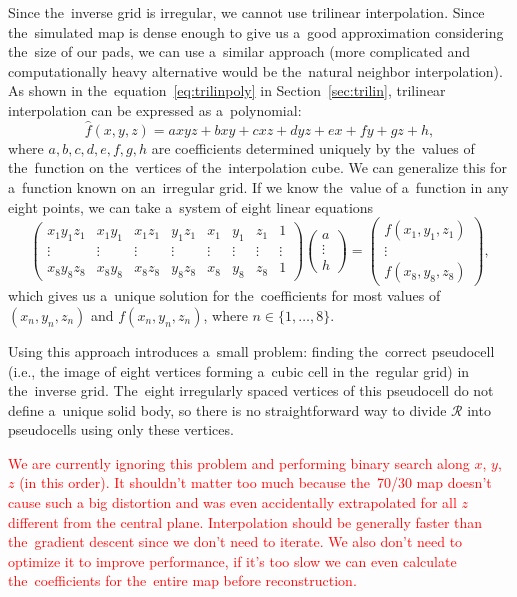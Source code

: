 			Since the~inverse grid is irregular, we cannot use trilinear interpolation. Since the~simulated map is dense enough to give us a~good approximation considering the~size of our pads, we can use a~similar approach (more complicated and computationally heavy alternative would be the~natural neighbor interpolation). As shown in the~equation~\ref{eq:trilinpoly} in Section~\ref{sec:trilin}, trilinear interpolation can be expressed as a~polynomial:
				\begin{equation}
					\widehat{f}(x,y,z) = axyz + bxy + cxz + dyz + ex + fy + gz + h,
				\end{equation}
			where $a,b,c,d,e,f,g,h$ are coefficients determined uniquely by the~values of the~function on the~vertices of the~interpolation cube. We can generalize this for a~function known on an~irregular grid. If we know the~value of a~function in any eight points, we can take a~system of eight linear equations
				\begin{equation}
					\begin{pmatrix}
						x_1 y_1 z_1 & x_1 y_1 & x_1 z_1 & y_1 z_1 & x_1 & y_1 & z_1 & 1\\
						\vdots & \vdots & \vdots & \vdots & \vdots & \vdots & \vdots & \vdots\\
						x_8 y_8 z_8 & x_8 y_8 & x_8 z_8 & y_8 z_8 & x_8 & y_8 & z_8 & 1
					\end{pmatrix}
					\begin{pmatrix}
						a\\
						\vdots\\
						h
					\end{pmatrix}
					=
					\begin{pmatrix}
						f(x_1,y_1,z_1)\\
						\vdots\\
						f(x_8,y_8,z_8)
					\end{pmatrix},
				\end{equation}
			which gives us a~unique solution for the~coefficients for most values of $(x_n, y_n, z_n)$ and $f(x_n,y_n,z_n)$, where $n\in\{1,\ldots,8\}$.
			
			Using this approach introduces a~small problem: finding the~correct pseudocell (i.e., the image of eight vertices forming a~cubic cell in the~regular grid) in the~inverse grid. The~eight irregularly spaced vertices of this pseudocell do not define a~unique solid body, so there is no straightforward way to divide $\mathcal{R}$ into pseudocells using only these vertices.
			
			\textcolor{red}{We are currently ignoring this problem and performing binary search along $x$, $y$, $z$ (in this order). It shouldn't matter too much because the~70/30 map doesn't cause such a big distortion and was even accidentally extrapolated for all $z$ different from the central plane.}
			\textcolor{red}{Interpolation should be generally faster than the~gradient descent since we don't need to iterate. We also don't need to optimize it to improve performance, if it's too slow we can even calculate the~coefficients for the~entire map before reconstruction.}
			
